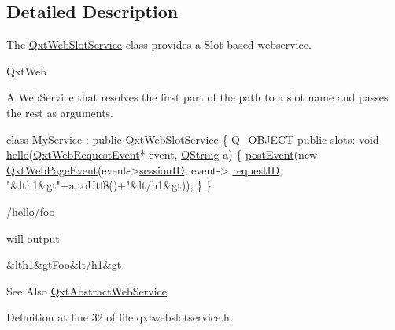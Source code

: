 \subsection{Detailed Description}
The \hyperlink{class_qxt_web_slot_service}{Qxt\-Web\-Slot\-Service} class provides a Slot based webservice. 

Qxt\-Web

A Web\-Service that resolves the first part of the path to a slot name and passes the rest as arguments.


\begin{DoxyCode}
\textcolor{keyword}{class }MyService : \textcolor{keyword}{public} \hyperlink{class_qxt_web_slot_service}{QxtWebSlotService}
\{
Q\_OBJECT
\textcolor{keyword}{public} slots:
    \textcolor{keywordtype}{void} \hyperlink{example_8c_a5086e15ab813b256ea192b78c78015e3}{hello}(\hyperlink{class_qxt_web_request_event}{QxtWebRequestEvent}* event, \hyperlink{group___u_a_v_objects_plugin_gab9d252f49c333c94a72f97ce3105a32d}{QString} a)
    \{
        \hyperlink{class_qxt_abstract_web_service_a5487b2135d56fd87a50c058e4a5317d7}{postEvent}(\textcolor{keyword}{new} \hyperlink{class_qxt_web_page_event}{QxtWebPageEvent}(event->\hyperlink{class_qxt_web_event_a3fdb1d80c46e535c2c79a06269a5d307}{sessionID}, event->
      \hyperlink{class_qxt_web_request_event_a79e20dd1cbc06f8cf1abe47bf6360277}{requestID}, \textcolor{stringliteral}{"&lth1&gt"}+a.toUtf8()+\textcolor{stringliteral}{"&lt/h1&gt));}
\textcolor{stringliteral}{    \}}
\textcolor{stringliteral}{\}}
\end{DoxyCode}


/hello/foo\par
 will output\par
 \&lth1\&gt\-Foo\&lt/h1\&gt\par


\begin{DoxySeeAlso}{See Also}
\hyperlink{class_qxt_abstract_web_service}{Qxt\-Abstract\-Web\-Service} 
\end{DoxySeeAlso}


Definition at line 32 of file qxtwebslotservice.\-h.



